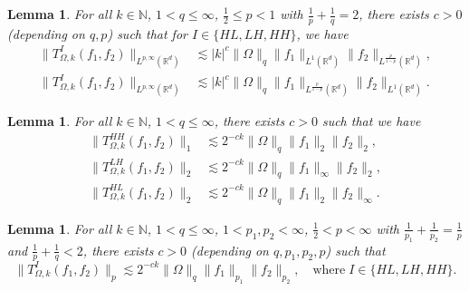 \documentclass[a4paper,reqno]{amsart}
\newcommand{\R}{{\mathbb R}}       %
\newcommand{\N}{{\mathbb N}}
\newtheorem{lemma}[theorem]{Lemma}
\theoremstyle{definition}
\numberwithin{equation}{section}
\begin{document}
\begin{lemma}\label{lemma:endpointCZ}
	For all $k\in\N$, $1< q\leq\infty$, $\frac{1}{2}\leq p<1$ with $\frac{1}{p}+\frac{1}{q}=2$, there exists $c>0$ (depending on $q,p$) such that for $I\in\{HL,LH,HH\}$, we have
	\begin{align*}
		\|T_{\Omega,k}^{I}(f_1,f_2)\|_{L^{p,\infty}(\R^d)}&\lesssim |k|^c\|\Omega\|_q\|f_1\|_{{L^{1}(\R^d)}}\|f_2\|_{{L^{\frac{p}{1-p}}(\R^d)}},\\
		\|T_{\Omega,k}^{I}(f_1,f_2)\|_{L^{p,\infty}(\R^d)}&\lesssim |k|^c\|\Omega\|_q\|f_1\|_{{L^{\frac{p}{1-p}}(\R^d)}}\|f_2\|_{{L^{1}(\R^d)}}.
	\end{align*}
\end{lemma}

\begin{lemma}\label{lemma:221}
	For all $k\in\N$, $1<q\leq\infty$, there exists $c>0$ such that we have 
	\begin{align*}
		\|T_{\Omega,k}^{HH}(f_1,f_2)\|_1&\lesssim 2^{-ck}\|\Omega\|_q\|f_1\|_2\|f_2\|_2,\\
		\|T_{\Omega,k}^{LH}(f_1,f_2)\|_2&\lesssim 2^{-ck}\|\Omega\|_q\|f_1\|_\infty\|f_2\|_2, \\
		\|T_{\Omega,k}^{HL}(f_1,f_2)\|_2&\lesssim 2^{-ck}\|\Omega\|_q\|f_1\|_2\|f_2\|_\infty.
	\end{align*}
\end{lemma}

\begin{lemma}\label{lemma:p1p2pDecay}
	For all $k\in\N$, $1<q\leq\infty$, $1< p_1,p_2<\infty$, $\frac{1}{2}<p<\infty$ with $\frac{1}{p_1}+\frac{1}{p_2}=\frac{1}{p}$ and $\frac{1}{p}+\frac{1}{q}<2$, there exists $c>0$ (depending on $q,p_1,p_2,p$) such that  
	\[\|T_{\Omega,k}^{I}(f_1,f_2)\|_p\lesssim 2^{-ck}\|\Omega\|_q\|f_1\|_{p_1}\|f_2\|_{p_2},\quad\text{where}\;I\in\{HL,LH,HH\}.\]
\end{lemma}
\end{document}
